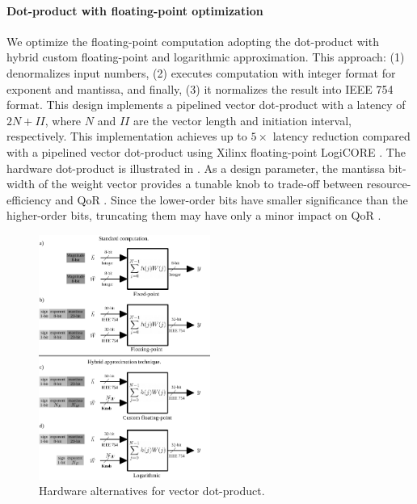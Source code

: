 \paragraph{\textbf{Dot-product with floating-point optimization}}
\label{sec:dot_product}
We optimize the floating-point computation adopting the dot-product with hybrid custom floating-point and logarithmic approximation\cite{nevarez2021accelerating}. This approach: (1) denormalizes input numbers, (2) executes computation with integer format for exponent and mantissa, and finally, (3) it normalizes the result into IEEE 754 format. This design implements a pipelined vector dot-product with a latency of $2N+II$, where $N$ and $II$ are the vector length and initiation interval, respectively. This implementation achieves up to $5\times$ latency reduction compared with a pipelined vector dot-product using Xilinx floating-point LogiCORE \cite{nevarez2021accelerating}. The hardware dot-product is illustrated in . As a design parameter, the mantissa bit-width of the weight vector provides a tunable knob to trade-off between resource-efficiency and QoR \cite{park2009dynamic}. Since the lower-order bits have smaller significance than the higher-order bits, truncating them may
have only a minor impact on QoR \cite{mittal2016survey}.

\begin{figure}[t!]
	\centering
	\includegraphics[width=0.5\textwidth]{../figures/dot-product_unit.pdf}
	\caption{Hardware alternatives for vector dot-product.}
	\label{fig:dot_product}
\end{figure}


